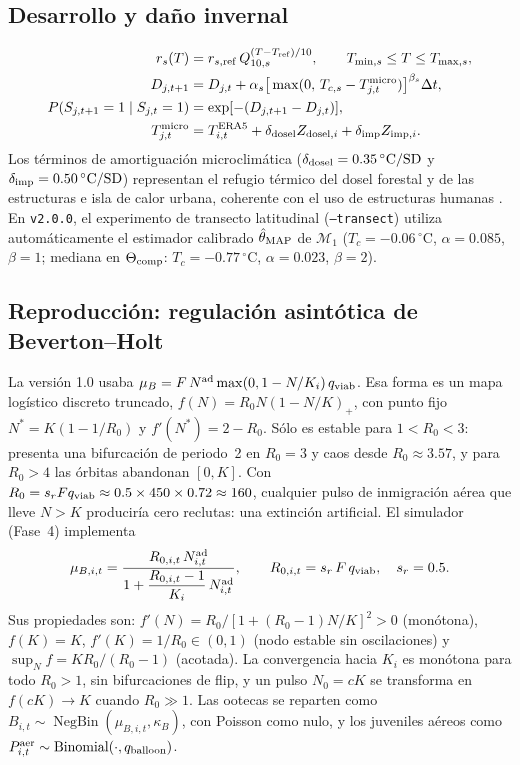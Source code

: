 \documentclass[11pt,letterpaper]{article}
\begin{document}
\subsection{Desarrollo y daño invernal}
\begin{align}
r_s(T)&=r_{s,\rm ref}\,Q_{10,s}^{(T-T_{\rm ref})/10},\qquad T_{\min,s}\le T\le T_{\max,s},\\
D_{j,t+1}&=D_{j,t}+\alpha_s\big[\max(0,\,T_{c,s}-T^{\rm micro}_{j,t})\big]^{\beta_s}\Delta t,\\
P(S_{j,t+1}=1\mid S_{j,t}=1)&=\exp[-(D_{j,t+1}-D_{j,t})],\\
T^{\rm micro}_{j,t}&=T^{\rm ERA5}_{i,t}+\delta_{\rm dosel}Z_{{\rm dosel},i}+\delta_{\rm imp}Z_{{\rm imp},i}.
\end{align}
Los términos de amortiguación microclimática ($\delta_{\rm dosel}=0.35\,^\circ\text{C/SD}$ y $\delta_{\rm imp}=0.50\,^\circ\text{C/SD}$) representan el refugio térmico del dosel forestal y de las estructuras e isla de calor urbana, coherente con el uso de estructuras humanas \cite{hoebeke2015,chuang2025}. En \texttt{v2.0.0}, el experimento de transecto latitudinal (\texttt{--transect}) utiliza automáticamente el estimador calibrado $\hat\theta_{\rm MAP}$ de $\mathcal M_1$ ($T_c=-0.06\,^\circ$C, $\alpha=0.085$, $\beta=1$; mediana en $\Theta_{\rm comp}$: $T_c=-0.77\,^\circ$C, $\alpha=0.023$, $\beta=2$).

\subsection{Reproducción: regulación asintótica de Beverton--Holt}
La versión 1.0 usaba $\mu_B=F\,N^{\rm ad}\max(0,1-N/K_i)\,q_{\rm viab}$. Esa forma es un mapa logístico discreto truncado, $f(N)=R_0N(1-N/K)_+$, con punto fijo $N^\ast=K(1-1/R_0)$ y $f'(N^\ast)=2-R_0$. Sólo es estable para $1<R_0<3$: presenta una bifurcación de periodo~2 en $R_0=3$ y caos desde $R_0\approx3.57$, y para $R_0>4$ las órbitas abandonan $[0,K]$. Con $R_0=s_rFq_{\rm viab}\approx0.5\times450\times0.72\approx160$, cualquier pulso de inmigración aérea que lleve $N>K$ produciría cero reclutas: una extinción artificial. El simulador (Fase~4) implementa
\begin{equation}
\mu_{B,i,t}=\frac{R_{0,i,t}\,N^{\rm ad}_{i,t}}{1+\dfrac{R_{0,i,t}-1}{K_i}\,N^{\rm ad}_{i,t}},\qquad R_{0,i,t}=s_r\,F\,q_{\rm viab},\quad s_r=0.5.
\end{equation}
Sus propiedades son: $f'(N)=R_0/[1+(R_0-1)N/K]^2>0$ (monótona), $f(K)=K$, $f'(K)=1/R_0\in(0,1)$ (nodo estable sin oscilaciones) y $\sup_Nf=KR_0/(R_0-1)$ (acotada). La convergencia hacia $K_i$ es monótona para todo $R_0>1$, sin bifurcaciones de flip, y un pulso $N_0=cK$ se transforma en $f(cK)\to K$ cuando $R_0\gg1$. Las ootecas se reparten como $B_{i,t}\sim\operatorname{NegBin}(\mu_{B,i,t},\kappa_B)$, con Poisson como nulo, y los juveniles aéreos como $P^{\rm aer}_{i,t}\sim\operatorname{Binomial}(\cdot,q_{\rm balloon})$.
\end{document}
